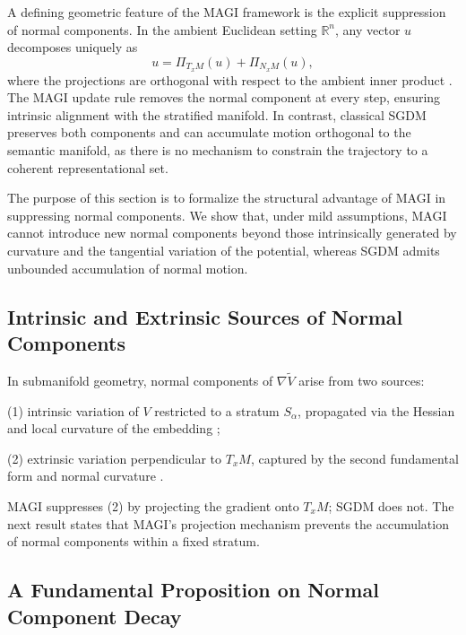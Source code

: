 \documentclass[12pt]{article}
\begin{document}
A defining geometric feature of the MAGI framework is the explicit suppression of normal components. In the ambient Euclidean setting $\mathbb{R}^n$, any vector $u$ decomposes uniquely as
\[
u = \Pi_{T_xM}(u) + \Pi_{N_xM}(u),
\]
where the projections are orthogonal with respect to the ambient inner product \citep{doCarmoRiemannian1992,LeeRiemannian2018}. The MAGI update rule removes the normal component at every step, ensuring intrinsic alignment with the stratified manifold. In contrast, classical SGDM \citep{Polyak1964,Sutskever2013} preserves both components and can accumulate motion orthogonal to the semantic manifold, as there is no mechanism to constrain the trajectory to a coherent representational set.

The purpose of this section is to formalize the structural advantage of MAGI in suppressing normal components. We show that, under mild assumptions, MAGI cannot introduce new normal components beyond those intrinsically generated by curvature and the tangential variation of the potential, whereas SGDM admits unbounded accumulation of normal motion.

\subsection*{Intrinsic and Extrinsic Sources of Normal Components}

In submanifold geometry, normal components of $\nabla \widetilde{V}$ arise from two sources:

(1) intrinsic variation of $V$ restricted to a stratum $S_\alpha$, propagated via the Hessian and local curvature of the embedding \citep{Sakai1996,doCarmoRiemannian1992};

(2) extrinsic variation perpendicular to $T_x M$, captured by the second fundamental form and normal curvature \citep{LeeRiemannian2018}.

MAGI suppresses (2) by projecting the gradient onto $T_xM$; SGDM does not. The next result states that MAGI’s projection mechanism prevents the accumulation of normal components within a fixed stratum.

\subsection*{A Fundamental Proposition on Normal Component Decay}
\end{document}
